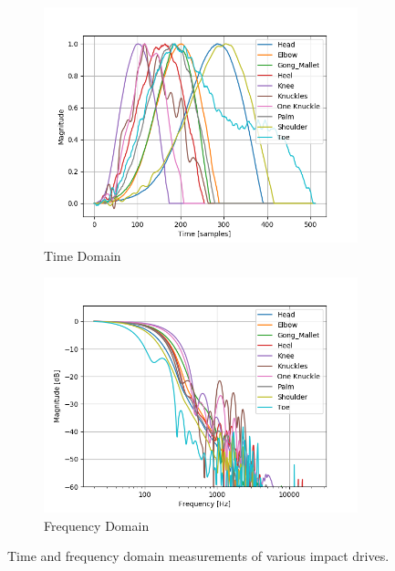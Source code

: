 \documentclass[twoside,a4paper]{article}
\begin{document}
\begin{figure}
\centering
    \begin{subfigure}[b]{\columnwidth}
         \centering
         \includegraphics[width=\columnwidth]{../Figures/Impacts_time}
         \caption{Time Domain}
    \end{subfigure}
    \begin{subfigure}[b]{\columnwidth}
         \centering
         \includegraphics[width=\columnwidth]{../Figures/Impacts_freq}
         \caption{Frequency Domain}
    \end{subfigure}
    \caption{Time and frequency domain measurements of various impact drives.}
    \label{fig:impact}
\end{figure}
\end{document}
